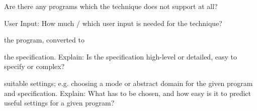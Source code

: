 \documentclass[a4paper]{article}
\begin{document}
\begin{minipage}[t]{0.16\linewidth}
\begin{betterlist}
\begin{betterlist}
\begin{betterlist}
			\end{betterlist}
			\item Are there any programs which the technique does not support at all?

		\end{betterlist}
		\item \alert{User Input:} How much / which user input is needed for the technique?
		\begin{betterlist}
			\item \checkboxChecked the program, converted to

			\item \checkboxHalfChecked the specification. Explain: Is the specification high-level or detailed, easy to specify or complex?

			\item \checkboxUnchecked suitable settings; e.g. choosing a mode or abstract domain for the given program and specification. Explain: What has to be chosen, and how easy is it to predict useful settings for a given program?


\end{betterlist}
\end{betterlist}
\end{minipage}
\end{document}
